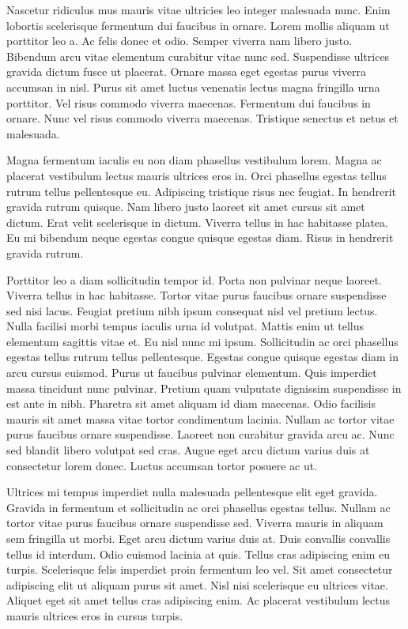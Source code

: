 \documentclass[11pt,a4paper]{article}
\begin{document}
Nascetur ridiculus mus mauris vitae ultricies leo integer malesuada nunc. Enim lobortis scelerisque fermentum dui faucibus in ornare. Lorem mollis aliquam ut porttitor leo a. Ac felis donec et odio. Semper viverra nam libero justo. Bibendum arcu vitae elementum curabitur vitae nunc sed. Suspendisse ultrices gravida dictum fusce ut placerat. Ornare massa eget egestas purus viverra accumsan in nisl. Purus sit amet luctus venenatis lectus magna fringilla urna porttitor. Vel risus commodo viverra maecenas. Fermentum dui faucibus in ornare. Nunc vel risus commodo viverra maecenas. Tristique senectus et netus et malesuada.

Magna fermentum iaculis eu non diam phasellus vestibulum lorem. Magna ac placerat vestibulum lectus mauris ultrices eros in. Orci phasellus egestas tellus rutrum tellus pellentesque eu. Adipiscing tristique risus nec feugiat. In hendrerit gravida rutrum quisque. Nam libero justo laoreet sit amet cursus sit amet dictum. Erat velit scelerisque in dictum. Viverra tellus in hac habitasse platea. Eu mi bibendum neque egestas congue quisque egestas diam. Risus in hendrerit gravida rutrum.

Porttitor leo a diam sollicitudin tempor id. Porta non pulvinar neque laoreet. Viverra tellus in hac habitasse. Tortor vitae purus faucibus ornare suspendisse sed nisi lacus. Feugiat pretium nibh ipsum consequat nisl vel pretium lectus. Nulla facilisi morbi tempus iaculis urna id volutpat. Mattis enim ut tellus elementum sagittis vitae et. Eu nisl nunc mi ipsum. Sollicitudin ac orci phasellus egestas tellus rutrum tellus pellentesque. Egestas congue quisque egestas diam in arcu cursus euismod. Purus ut faucibus pulvinar elementum. Quis imperdiet massa tincidunt nunc pulvinar. Pretium quam vulputate dignissim suspendisse in est ante in nibh. Pharetra sit amet aliquam id diam maecenas. Odio facilisis mauris sit amet massa vitae tortor condimentum lacinia. Nullam ac tortor vitae purus faucibus ornare suspendisse. Laoreet non curabitur gravida arcu ac. Nunc sed blandit libero volutpat sed cras. Augue eget arcu dictum varius duis at consectetur lorem donec. Luctus accumsan tortor posuere ac ut.

Ultrices mi tempus imperdiet nulla malesuada pellentesque elit eget gravida. Gravida in fermentum et sollicitudin ac orci phasellus egestas tellus. Nullam ac tortor vitae purus faucibus ornare suspendisse sed. Viverra mauris in aliquam sem fringilla ut morbi. Eget arcu dictum varius duis at. Duis convallis convallis tellus id interdum. Odio euismod lacinia at quis. Tellus cras adipiscing enim eu turpis. Scelerisque felis imperdiet proin fermentum leo vel. Sit amet consectetur adipiscing elit ut aliquam purus sit amet. Nisl nisi scelerisque eu ultrices vitae. Aliquet eget sit amet tellus cras adipiscing enim. Ac placerat vestibulum lectus mauris ultrices eros in cursus turpis.
\end{document}
